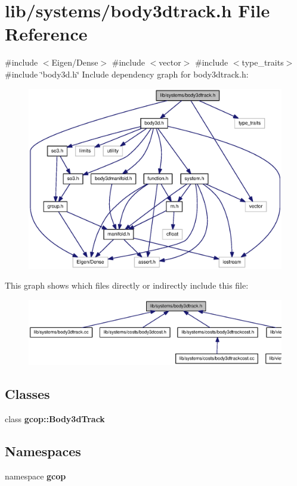 \section{lib/systems/body3dtrack.h \-File \-Reference}
\label{body3dtrack_8h}
{\ttfamily \#include $<$\-Eigen/\-Dense$>$}\*
{\ttfamily \#include $<$vector$>$}\*
{\ttfamily \#include $<$type\-\_\-traits$>$}\*
{\ttfamily \#include \char`\"{}body3d.\-h\char`\"{}}\*
\-Include dependency graph for body3dtrack.\-h\-:\nopagebreak
\begin{figure}[H]
\begin{center}
\leavevmode
\includegraphics[width=350pt]{body3dtrack_8h__incl}
\end{center}
\end{figure}
\-This graph shows which files directly or indirectly include this file\-:\nopagebreak
\begin{figure}[H]
\begin{center}
\leavevmode
\includegraphics[width=350pt]{body3dtrack_8h__dep__incl}
\end{center}
\end{figure}
\subsection*{\-Classes}
\begin{DoxyCompactItemize}
\item 
class {\bf gcop\-::\-Body3d\-Track}
\end{DoxyCompactItemize}
\subsection*{\-Namespaces}
\begin{DoxyCompactItemize}
\item 
namespace {\bf gcop}
\end{DoxyCompactItemize}
